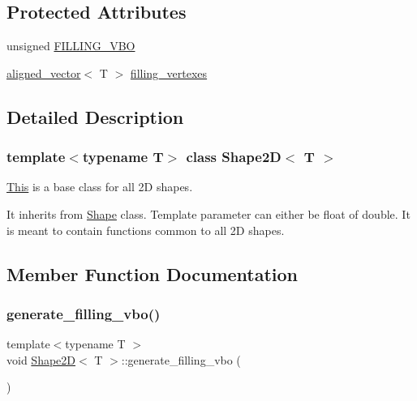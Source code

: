 \subsection*{Protected Attributes}
\begin{DoxyCompactItemize}
\item 
unsigned \mbox{\hyperlink{classShape2D_a220cf4cf96da8bd43627ffffd00a0718}{F\+I\+L\+L\+I\+N\+G\+\_\+\+V\+BO}}
\item 
\mbox{\hyperlink{type__definitions_8hpp_accb98a876f193a416d9c8a02fe22d526}{aligned\+\_\+vector}}$<$ T $>$ \mbox{\hyperlink{classShape2D_ae3e216c9d8422b47f46bff9259bd17be}{filling\+\_\+vertexes}}
\end{DoxyCompactItemize}


\subsection{Detailed Description}
\subsubsection*{template$<$typename T$>$\newline
class Shape2\+D$<$ T $>$}

\mbox{\hyperlink{classThis}{This}} is a base class for all 2D shapes. 

It inherits from \mbox{\hyperlink{classShape}{Shape}} class. Template parameter can either be float of double. It is meant to contain functions common to all 2D shapes. 

\subsection{Member Function Documentation}
\mbox{\label{classShape2D_a210e702aa5918b88f25fb6b63a911fc8}} 
\subsubsection{\texorpdfstring{generate\+\_\+filling\+\_\+vbo()}{generate\_filling\_vbo()}\hspace{0.1cm}{\footnotesize\ttfamily [1/2]}}
{\footnotesize\ttfamily template$<$typename T $>$ \\
void \mbox{\hyperlink{classShape2D}{Shape2D}}$<$ T $>$\+::generate\+\_\+filling\+\_\+vbo (\begin{DoxyParamCaption}{ }\end{DoxyParamCaption})\hspace{0.3cm}{\ttfamily [protected]}}

